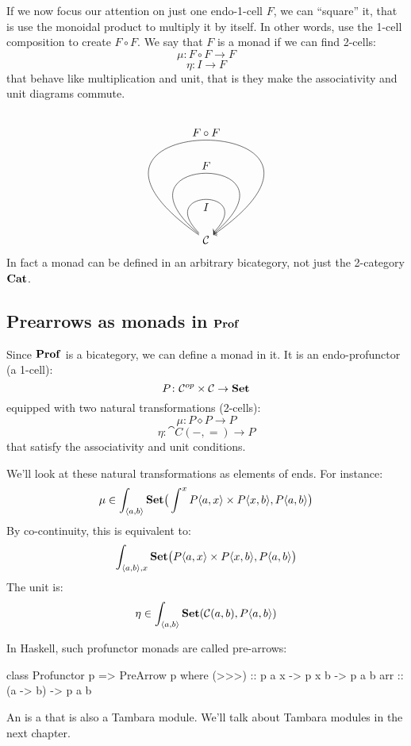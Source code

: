 \documentclass[DaoFP]{subfiles}
\begin{document}
If we now focus our attention on just one endo-1-cell $F$, we can ``square'' it, that is use the monoidal product to multiply it by itself. In other words, use the 1-cell composition to create $F \circ F$. We say that $F$ is a monad if we can find 2-cells:
\[ \mu \colon F \circ F \to F \]
\[ \eta \colon I \to F \]
that behave like multiplication and unit, that is they make the associativity and unit diagrams commute. 
\[
   \begin{tikzpicture}
        \node [] (star) {$\cat C$} ;
        \path[->,draw] (star) to  [in=45,out=135, loop,distance=2cm] node[ below] {$I$} (star);
        \path[->,draw] (star) to  [in=40,out=140, loop,distance=4cm] node[above] {$F$} (star);
        \path[->,draw] (star) to  [ in=35,out=145, loop,distance=7cm] node[auto] {$F \circ F$} (star);
    \end{tikzpicture}
\]
In fact a monad can be defined in an arbitrary bicategory, not just the 2-category $\mathbf{Cat}$. 

\subsection{Prearrows as monads in $\mathbf{Prof}$}

Since $\mathbf{Prof}$ is a bicategory, we can define a monad in it. It is an endo-profunctor (a 1-cell):
\[ P \colon \mathcal{C}^{op} \times \mathcal{C} \to \mathbf{Set} \]
equipped with two natural transformations (2-cells):
\[ \mu \colon P \diamond P \to P \]
\[ \eta \colon \cat C(-, =) \to P \]
that satisfy the associativity and unit conditions.

We'll look at these natural transformations as elements of ends. For instance:
\[ \mu \in \int_{\langle a, b \rangle} \mathbf{Set} \big( \int^x P \langle a, x \rangle \times P \langle x, b \rangle,  P\langle a, b \rangle \big) \]
By co-continuity, this is equivalent to:
\[ \int_{\langle a, b \rangle, x} \mathbf{Set} \big(P \langle a, x \rangle \times P \langle x, b \rangle,  P\langle a, b \rangle \big) \]
The unit is:
\[ \eta \in \int_{\langle a, b \rangle} \mathbf{Set} (\mathcal{C}(a, b), P\langle a, b \rangle) \]

In Haskell, such profunctor monads are called pre-arrows:
\begin{haskell}
class Profunctor p => PreArrow p where
  (>>>) :: p a x -> p x b -> p a b
  arr   :: (a -> b) -> p a b
\end{haskell}
An  is a  that is also a Tambara module. We'll talk about Tambara modules in the next chapter.
\end{document}
